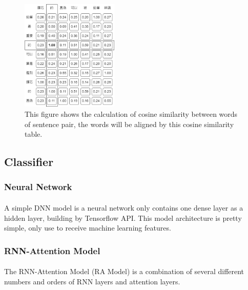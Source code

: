 \documentclass{article}
\begin{document}
\begin{CJK*}{UTF8}{bkai}
\begin{figure}[!ht]
  \centering
  \includegraphics[width=175px]{CSA.png}
  \caption[Cosine Similarity Alignment]{This figure shows the calculation of cosine similarity between words of sentence pair, the words will be aligned by this cosine similarity table.}
  \label{fig:csa}
\end{figure}

\subsection{Classifier}

\subsubsection{Neural Network}
\paragraph{}
A simple DNN model is a neural network only contains one dense layer as a hidden layer, building by Tensorflow API. This model architecture is pretty simple, only use to receive machine learning features.

\subsubsection{RNN-Attention Model}
\paragraph{}
The RNN-Attention Model (RA Model) is a combination of several different numbers and orders of RNN layers and attention layers.


\end{CJK*}
\end{document}
